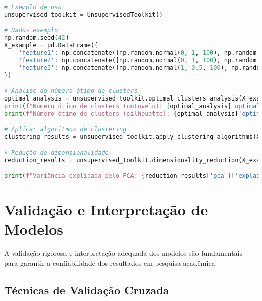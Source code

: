 \begin{pythonbox}
\begin{lstlisting}[language=Python]  
# Exemplo de uso
unsupervised_toolkit = UnsupervisedToolkit()

# Dados exemplo
np.random.seed(42)
X_example = pd.DataFrame({
    'feature1': np.concatenate([np.random.normal(0, 1, 100), np.random.normal(3, 1, 100)]),
    'feature2': np.concatenate([np.random.normal(0, 1, 100), np.random.normal(3, 1, 100)]),
    'feature3': np.concatenate([np.random.normal(1, 0.5, 100), np.random.normal(2, 0.5, 100)])
})

# Análise do número ótimo de clusters
optimal_analysis = unsupervised_toolkit.optimal_clusters_analysis(X_example)
print(f"Número ótimo de clusters (cotovelo): {optimal_analysis['optimal_k_elbow']}")
print(f"Número ótimo de clusters (silhouette): {optimal_analysis['optimal_k_silhouette']}")

# Aplicar algoritmos de clustering
clustering_results = unsupervised_toolkit.apply_clustering_algorithms(X_example, n_clusters=2)

# Redução de dimensionalidade
reduction_results = unsupervised_toolkit.dimensionality_reduction(X_example)

print(f"Variância explicada pelo PCA: {reduction_results['pca']['explained_variance_ratio']}")
\end{lstlisting}
\end{pythonbox}

\section{Validação e Interpretação de Modelos}

A validação rigorosa e interpretação adequada dos modelos são fundamentais para garantir a confiabilidade dos resultados em pesquisa acadêmica.

\subsection{Técnicas de Validação Cruzada}

